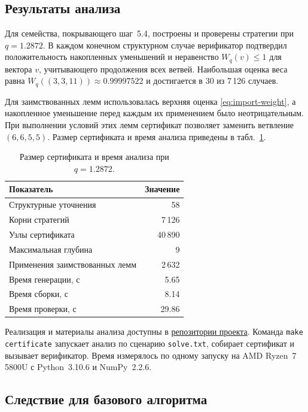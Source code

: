 \documentclass[10pt,twoside]{article}
\theoremstyle{definition}
\theoremstyle{remark}
\begin{document}
\subsection{Результаты анализа}
\label{sec:artifact}

Для семейства, покрывающего шаг~5.4, построены и проверены
стратегии при $q=1.2872$. В каждом конечном структурном случае
верификатор подтвердил положительность накопленных уменьшений
и неравенство $W_q(v)\le 1$ для вектора $v$, учитывающего продолжения
всех ветвей. Наибольшая оценка веса равна
$W_q((3,3,11))\approx0.99997522$ и достигается в 30 из 7\,126 случаев.

Для заимствованных лемм использовалась верхняя оценка
\eqref{eq:import-weight}, а накопленное уменьшение перед каждым их
применением было неотрицательным. При выполнении условий этих лемм
сертификат позволяет заменить ветвление $(6,6,5,5)$.
Размер сертификата и время анализа приведены в табл.~\ref{tab:artifact-summary}.

\begin{table}[!htbp]
\centering\small
\begin{tabular}{@{}lr@{}}
\toprule
Показатель & Значение \\
\midrule
Структурные уточнения & 58 \\
Корни стратегий & 7\,126 \\
Узлы сертификата & 40\,890 \\
Максимальная глубина & 9 \\
Применения заимствованных лемм & 2\,632 \\
Время генерации, с & 5.65 \\
Время сборки, с & 8.14 \\
Время проверки, с & 29.86 \\
\bottomrule
\end{tabular}
\caption{Размер сертификата и время анализа при $q=1.2872$.}
\label{tab:artifact-summary}
\end{table}

Реализация и материалы анализа доступны в
\href{https://github.com/kisorimaD/maxsat_prover}{репозитории проекта}.
Команда \texttt{make certificate} запускает анализ по сценарию
\texttt{solve.txt}, собирает сертификат и вызывает верификатор.
Время измерялось по одному запуску на AMD Ryzen~7 5800U с Python~3.10.6
и NumPy~2.2.6.

\subsection{Следствие для базового алгоритма}
\end{document}
